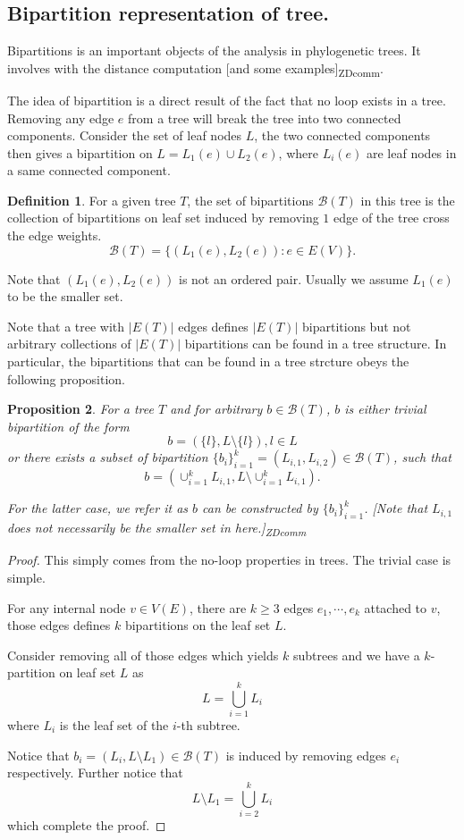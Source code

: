 \documentclass[11pt]{article}
\theoremstyle{definition}
\newtheorem{defn}{Definition}[section]
\theoremstyle{remark}
\theoremstyle{plain}
\newtheorem{prop}[defn]{Proposition}
\newcommand{\zdcomm}[1]{ {\color{blue} [#1]\textsubscript{ZDcomm}}}
\begin{document}
\subsection{Bipartition representation of tree.}

Bipartitions is an important objects of the analysis in phylogenetic trees. It involves with the distance computation \zdcomm{and some examples}. 

The idea of bipartition is a direct result of the fact that no loop exists in a tree. Removing any edge $e$ from a tree will break the tree into two connected components. Consider the set of leaf nodes $L$, the two connected components then gives a bipartition on $L = L_1(e)\cup L_2(e)$, where $L_i(e)$ are leaf nodes in a same connected component.

\begin{defn}
	For a given tree $T$, the set of bipartitions $\mathcal{B}(T)$ in this tree is the collection of bipartitions on leaf set induced by removing $1$ edge of the tree cross the edge weights.
	\[
		\mathcal{B}(T) = \{(L_1(e), L_2(e)):e\in E(V)\}.
	\]

	Note that $(L_1(e),L_2(e))$ is not an ordered pair. Usually we assume $L_1(e)$ to be the smaller set.
\end{defn}

Note that a tree with $|E(T)|$ edges defines $|E(T)|$ bipartitions but not arbitrary collections of $|E(T)|$ bipartitions can be found in a tree structure. In particular, the bipartitions that can be found in a tree strcture obeys the following proposition.

\begin{prop}\label{prop:bipartition-in-tree}
	For a tree $T$ and for arbitrary $b\in \mathcal{B}(T)$, $b$ is either trivial bipartition of the form
	\[
		b = (\{l\}, L\setminus \{l\}), l \in L
	\]
	or there exists a subset of bipartition $\{b_i\}_{i=1}^k = (L_{i,1},L_{i,2})\in \mathcal{B}(T)$, such that
	\[
		b = (\cup_{i= 1}^kL_{i,1},L\setminus \cup_{i= 1}^kL_{i,1}).
	\]

	For the latter case, we refer it as $b$ can be constructed by $\{b_i\}_{i=1}^k$.
	\zdcomm{Note that $L_{i, 1}$ does not necessarily be the smaller set in here.}
\end{prop}
\begin{proof}
	This simply comes from the no-loop properties in trees. The trivial case is simple.

	For any internal node $v\in V(E)$, there are $k\geq 3$ edges $e_1,\cdots, e_k$ attached to $v$, those edges defines $k$ bipartitions on the leaf set $L$.

	Consider removing all of those edges which yields $k$ subtrees and we have a $k$-partition on leaf set $L$ as
	\[
		L = \bigcup_{i=1}^{k}L_i
	\]
	where $L_i$ is the leaf set of the $i$-th subtree.

	Notice that $b_i = (L_i, L\setminus L_1)\in \mathcal{B}(T)$ is induced by removing edges $e_i$ respectively. Further notice that 
	\[
		L\setminus L_1 = \bigcup_{i=2}^kL_i
	\]
	which complete the proof.
\end{proof}
\end{document}
